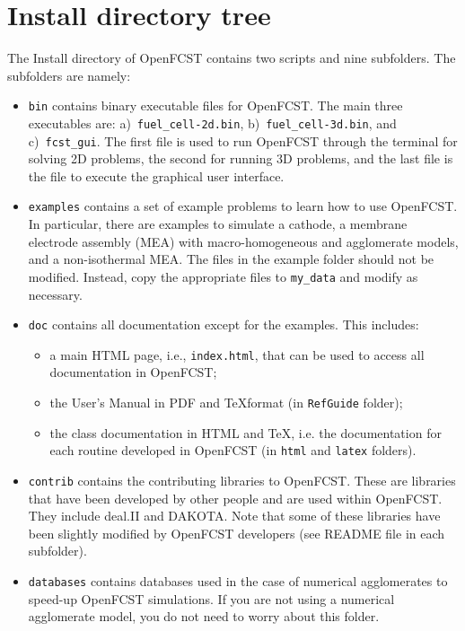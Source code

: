 \section{Install directory tree}
The Install directory of OpenFCST contains two scripts and nine subfolders. The subfolders are namely:
\begin{itemize}
 \item \texttt{bin} contains binary executable files for OpenFCST. The main three executables are: a)~\texttt{fuel\_cell-2d.bin}, b)~\texttt{fuel\_cell-3d.bin}, and c)~\texttt{fcst\_gui}. The first file is used to run OpenFCST through the terminal for solving 2D problems, the second for running 3D problems, and the last file is the file to execute the graphical user interface. 
 \item \texttt{examples} contains a set of example problems to learn how to use OpenFCST. In particular, there are examples to simulate a cathode, a membrane electrode assembly (MEA) with macro-homogeneous and agglomerate models, and a non-isothermal MEA. The files in the example folder should not be modified. Instead, copy the appropriate files to \texttt{my\_data} and modify as necessary.
 \item \texttt{doc} contains all documentation except for the examples. This includes:
 \begin{itemize}
  \item a main HTML page, i.e., \texttt{index.html}, that can be used to access all documentation in OpenFCST;
  \item the User’s Manual in PDF and \TeX format (in \texttt{RefGuide} folder);
  \item the class documentation in HTML and \TeX, i.e. the documentation for each routine developed in OpenFCST (in \texttt{html} and \texttt{latex} folders).
 \end{itemize}
 \item \texttt{contrib} contains the contributing libraries to OpenFCST. These are libraries that have been developed by other people and are used within OpenFCST. They include deal.II and DAKOTA. Note that some of these libraries have been slightly modified by OpenFCST developers (see README file in each subfolder).
 \item \texttt{databases} contains databases used in the case of numerical agglomerates to speed-up OpenFCST simulations. If you are not using a numerical agglomerate model, you do not need to worry about this folder.

\end{itemize}
